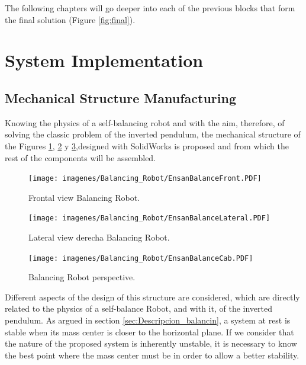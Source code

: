 
The following chapters will go deeper into each of the previous blocks that form the final solution (Figure \ref{fig:final}). 


\newpage
\section{System Implementation}\label{sec:Implementacion}
\subsection{Mechanical Structure Manufacturing}
Knowing the physics of a self-balancing robot \cite{6845943} \cite{7112017} and with the aim, therefore, of solving the classic problem of the inverted pendulum, the mechanical structure of the Figures \ref{fig:EnsanBalanceFront}, \ref{fig:EnsanBalanceLateral} y \ref{fig:EnsanBalanceCab},designed with SolidWorks is proposed and from which the rest of the components will be assembled.

\begin{center}
	\begin{figure}[H]
		\center
		\texttt{[image: imagenes/Balancing\_Robot/EnsanBalanceFront.PDF]}
		\caption{Frontal view Balancing Robot.}
		\label{fig:EnsanBalanceFront}
	\end{figure}
\end{center}

\begin{center}
	\begin{figure}[H]
		\center
		\texttt{[image: imagenes/Balancing\_Robot/EnsanBalanceLateral.PDF]}
		\caption{Lateral view derecha Balancing Robot.}
		\label{fig:EnsanBalanceLateral}
	\end{figure}
\end{center}

\begin{center}
	\begin{figure}[H]
		\center
		\texttt{[image: imagenes/Balancing\_Robot/EnsanBalanceCab.PDF]}
		\caption{Balancing Robot perspective.}
		\label{fig:EnsanBalanceCab}
	\end{figure}
\end{center}

Different aspects of the design of this structure are considered, which are directly related to the physics of a self-balance Robot, and with it, of the inverted pendulum. \newline
As argued in section \ref{sec:Descripcion_balancin}, a system at rest is stable when its mass center is closer to the horizontal plane. If we consider that the nature of the proposed system is inherently unstable, it is necessary to know the best point where the mass center must be in order to allow a better stability. \newline

